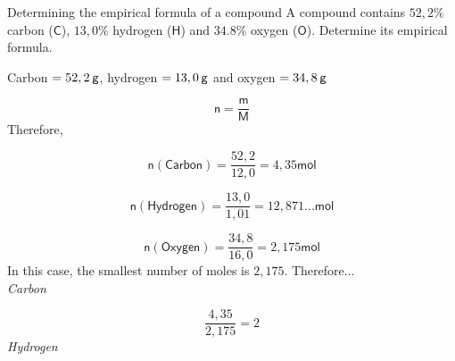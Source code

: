     \noindent
\label{m38712*secfhsst!!!underscore!!!id1029}\vspace{-1cm} 
      \noindent 
      \begin{wex}{Determining the empirical formula of a compound }{
      \label{m38712*probfhsst!!!underscore!!!id1030}
      \label{m38712*id280897}A compound contains $52,2\%$ carbon ($\mathsf{C}$), $13,0\%$ hydrogen ($\mathsf{H}$) and $34.8\%$ oxygen ($\mathsf{O}$). Determine its empirical formula. 
      \vspace{5pt}
}
{ %
      \label{m38712*id280928}Carbon $=52,2\phantom{\rule{2pt}{0ex}}\mathsf{g}$, hydrogen $=13,0\phantom{\rule{2pt}{0ex}}\mathsf{g}$ and oxygen $=34,8\phantom{\rule{2pt}{0ex}}\mathsf{g}$ 
      \label{m38712*id280954}\nopagebreak\noindent{}
        
    \begin{equation*}
    \mathsf{n}=\frac{\mathsf{m}}{\mathsf{M}}
      \end{equation*}
      \label{m38712*id280975}Therefore, 
      \label{m38712*id280978}\nopagebreak\noindent{}
        
    \begin{equation*}
    \mathsf{n}\left(\mathsf{Carbon}\right)=\frac{52,2}{12,0}=4,35\mathsf{mol}
      \end{equation*}
      \label{m38712*id281042}\nopagebreak\noindent{}
        
    \begin{equation*}
    \mathsf{n}\left(\mathsf{Hydrogen}\right)=\frac{13,0}{1,01}=12,871...\mathsf{mol}
      \end{equation*}
      \label{m38712*id281111}\nopagebreak\noindent{}
        
    \begin{equation*}
    \mathsf{n}\left(\mathsf{Oxygen}\right)=\frac{34,8}{16,0}=2,175\mathsf{mol}
      \end{equation*}
In this case, the smallest number of moles is $2,175$. Therefore... \\ 
      \label{m38712*id281179}
        \textsl{Carbon}
 
      \label{m38712*id281185}\nopagebreak\noindent{}
        
    \begin{equation*}
    \frac{4,35}{2,175}=2
      \end{equation*}
      \label{m38712*id281217}
        \textsl{Hydrogen}
     
}
\end{wex}
